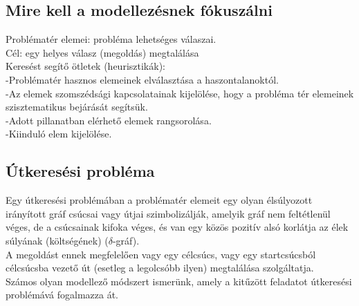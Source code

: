 \documentclass{article}
\begin{document}
	\subsection{Mire kell a modellezésnek fókuszálni}
	Problématér elemei: probléma lehetséges válaszai.\\
	Cél: egy helyes válasz (megoldás) megtalálása\\
	Keresést segítő ötletek (heurisztikák): \\
	-Problématér hasznos elemeinek elválasztása a haszontalanoktól.\\
	-Az elemek szomszédsági kapcsolatainak kijelölése, hogy a probléma tér elemeinek szisztematikus bejárását segítsük.\\
	-Adott pillanatban elérhető elemek rangsorolása.\\
	-Kiinduló elem kijelölése.\\
	
	\newpage
	\subsection{Útkeresési probléma}
	Egy útkeresési problémában a problématér elemeit egy olyan élsúlyozott irányított gráf csúcsai vagy útjai szimbolizálják, amelyik gráf nem feltétlenül véges, de a csúcsainak kifoka véges, és van egy közös pozitív alsó korlátja az élek súlyának (költségének) ($\delta$-gráf).\\
	A megoldást ennek megfelelően vagy egy célcsúcs, vagy egy startcsúcsból célcsúcsba vezető út (esetleg a legolcsóbb ilyen) megtalálása szolgáltatja.\\
	Számos olyan modellező módszert ismerünk, amely a kitűzött feladatot útkeresési problémává fogalmazza át.
	
\end{document}
